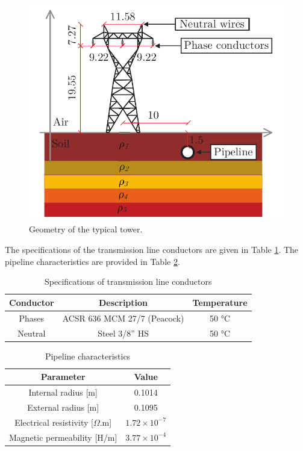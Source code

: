 \documentclass[conference]{IEEEtran}
\begin{document}
	\begin{figure}[hbt]
		\begin{center}
			\includegraphics[width=.8\columnwidth]{fig/SistTesteCorte5layers2.pdf}
			\caption{Geometry of the typical tower.}
			\label{fig:SistTesteCorte}
		\end{center}
	\end{figure}
	
	The specifications of the transmission line conductors  are given in Table \ref{table:LTCond}. The pipeline characteristics are provided in Table \ref{table:PipeParam}.
	
	\begin{table}[!hbt]
		\renewcommand{\arraystretch}{1.3}
		\caption{Specifications of transmission line conductors}
		\label{table:LTCond}
		\centering
		\begin{tabular}{|c|c|c|}
			\hline
			\textbf{Conductor} & \textbf{Description} & \textbf{Temperature} \\
			\hline
			Phases & ACSR 636 MCM 27/7 (Peacock) & 50 °C\\
			\hline
			Neutral & Steel 3/8” HS & 50 °C\\
			\hline
		\end{tabular}
	\end{table}
	
	\begin{table}[!hbt]
		\renewcommand{\arraystretch}{1.3}
		\caption{Pipeline characteristics}
		\label{table:PipeParam}
		\centering
		\begin{tabular}{|c|c|}
			\hline
			\textbf{Parameter} & \textbf{Value} \\
			\hline
			Internal radius [m] & 0.1014\\
			\hline
			External radius [m] & 0.1095\\
			\hline
			Electrical resistivity [$\Omega$.m] & $1.72\times10^{-7}$\\
			\hline
			Magnetic permeability [H/m] & $3.77\times10^{-4}$\\
			\hline
		\end{tabular}
	\end{table}
	
\end{document}
